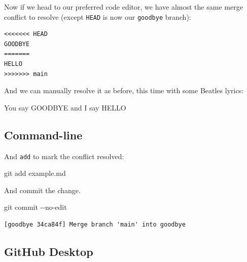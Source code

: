 \documentclass[
  letterpaper,
  DIV=11,
  numbers=noendperiod]{scrartcl}
\newenvironment{Shaded}{\begin{snugshade}}{\end{snugshade}}
\newcommand{\AttributeTok}[1]{\textcolor[rgb]{0.40,0.45,0.13}{#1}}
\newcommand{\FunctionTok}[1]{\textcolor[rgb]{0.28,0.35,0.67}{#1}}
\newcommand{\NormalTok}[1]{\textcolor[rgb]{0.00,0.23,0.31}{#1}}
\begin{document}
Now if we head to our preferred code editor, we have almost the same
merge conflict to resolve (except \texttt{HEAD} is now our
\texttt{goodbye} branch):

\begin{verbatim}
<<<<<<< HEAD
GOODBYE
=======
HELLO
>>>>>>> main
\end{verbatim}

And we can manually resolve it as before, this time with some Beatles
lyrics:

\begin{tcolorbox}[enhanced jigsaw, rightrule=.15mm, opacitybacktitle=0.6, bottomtitle=1mm, colbacktitle=quarto-callout-note-color!10!white, toprule=.15mm, title=\textcolor{quarto-callout-note-color}{\faInfo}\hspace{0.5em}{example.md}, toptitle=1mm, left=2mm, leftrule=.75mm, titlerule=0mm, bottomrule=.15mm, colframe=quarto-callout-note-color-frame, arc=.35mm, coltitle=black, breakable, colback=white, opacityback=0]

You say GOODBYE and I say HELLO

\end{tcolorbox}

\subsection{Command-line}

And \texttt{add} to mark the conflict resolved:

\begin{Shaded}
\begin{Highlighting}[]
\FunctionTok{git}\NormalTok{ add example.md}
\end{Highlighting}
\end{Shaded}

And commit the change.

\begin{Shaded}
\begin{Highlighting}[]
\FunctionTok{git}\NormalTok{ commit }\AttributeTok{{-}{-}no{-}edit}
\end{Highlighting}
\end{Shaded}

\begin{verbatim}
[goodbye 34ca84f] Merge branch 'main' into goodbye
\end{verbatim}

\subsection{GitHub Desktop}
\end{document}
